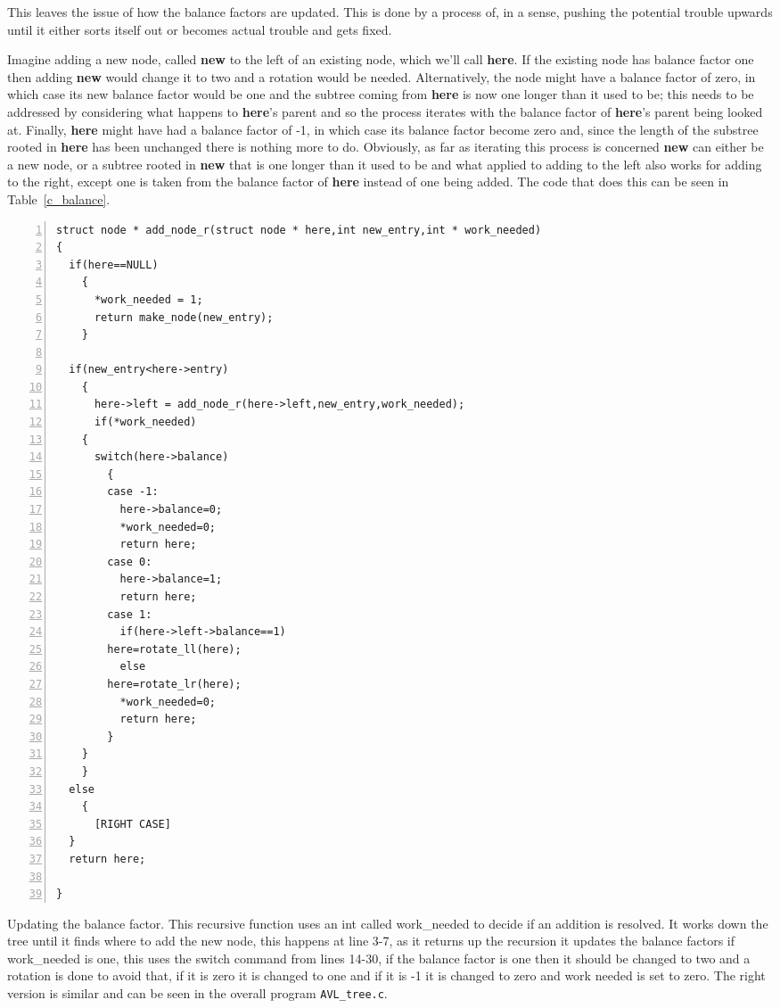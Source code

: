 \documentclass[11pt,a4paper]{scrartcl}
\begin{document}
This leaves the issue of how the balance factors are updated. This is
done by a process of, in a sense, pushing the potential trouble upwards
until it either sorts itself out or becomes actual trouble and gets
fixed.  

Imagine adding a new node, called {\bf new} to the left of an existing
node, which we'll call {\bf here}. If the existing node has balance
factor one then adding {\bf new} would change it to two and a rotation
would be needed. Alternatively, the node might have a balance factor
of zero, in which case its new balance factor would be one and the
subtree coming from {\bf here} is now one longer than it used to be;
this needs to be addressed by considering what happens to {\bf here}'s
parent and so the process iterates with the balance factor of {\bf
  here}'s parent being looked at. Finally, {\bf here} might have had a
balance factor of -1, in which case its balance factor become zero
and, since the length of the substree rooted in {\bf here} has been
unchanged there is nothing more to do. Obviously, as far as iterating
this process is concerned {\bf new} can either be a new node, or a
subtree rooted in {\bf new} that is one longer than it used to be and
what applied to adding to the left also works for adding to the right,
except one is taken from the balance factor of {\bf here} instead of
one being added. The code that does this can be seen in Table~\ref{c_balance}.

\begin{table}
\begin{lstlisting}[numbers=left]
struct node * add_node_r(struct node * here,int new_entry,int * work_needed)
{
  if(here==NULL)
    {
      *work_needed = 1;
      return make_node(new_entry);
    }
  
  if(new_entry<here->entry)
    {
      here->left = add_node_r(here->left,new_entry,work_needed);
      if(*work_needed)
	{
	  switch(here->balance)
	    {
	    case -1:
	      here->balance=0;
	      *work_needed=0;
	      return here;
	    case 0:
	      here->balance=1;
	      return here;
	    case 1:
	      if(here->left->balance==1)
		here=rotate_ll(here);
	      else
		here=rotate_lr(here);
	      *work_needed=0;
	      return here;
	    }
	}
    }
  else
    {
      [RIGHT CASE]
  }
  return here;

}
\end{lstlisting}
\caption{Updating the balance factor. This recursive function uses an int called work\_needed to decide if an addition is resolved. It works down the tree until it finds where to add the new node, this happens at line 3-7, as it returns up the recursion it updates the balance factors if work\_needed is one, this uses the switch command from lines 14-30, if the balance factor is one then it should be changed to two and a rotation is done to avoid that, if it is zero it is changed to one and if it is -1 it is changed to zero and work needed is set to zero. The right version is similar and can be seen in the overall program {\tt AVL\_tree.c}.\label{c_balance}}
\end{table}
\end{document}

